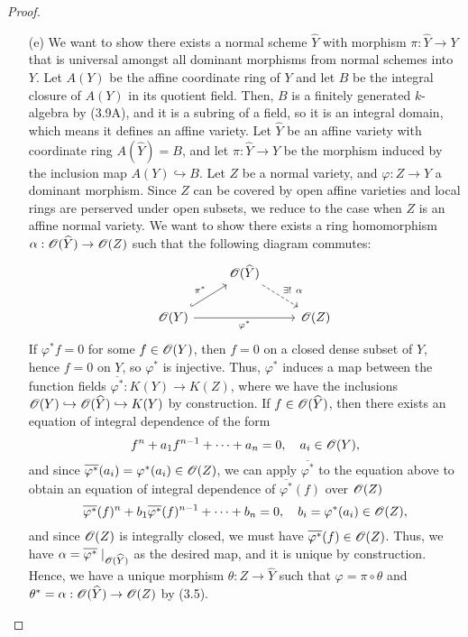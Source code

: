 \documentclass{article}
\begin{document}
\begin{enumerate} [label=\textbf{\arabic*.}, leftmargin=-0.05em]
\begin{proof}
\begin{itemize} [leftmargin=0cm]
    \item[(e)] We want to show there exists a normal scheme $\widehat{Y}$ with morphism $\pi : \widehat{Y} \to Y$ that is universal amongst all dominant morphisms from normal schemes into $Y$.
    Let $A(Y)$ be the affine coordinate ring of $Y$ and let $B$ be the integral closure of $A(Y)$ in its quotient field.
    Then, $B$ is a finitely generated $k$-algebra by (3.9A), and it is a subring of a field, so it is an integral domain, which means it defines an affine variety.
    Let $\widehat{Y}$ be an affine variety with coordinate ring $A(\widehat{Y}) = B$, and let $\pi : \widehat{Y} \to Y$ be the morphism induced by the inclusion map $A(Y) \hookrightarrow B$.
    Let $Z$ be a normal variety, and $\varphi : Z \to Y$ a dominant morphism.
    Since $Z$ can be covered by open affine varieties and local rings are perserved under open subsets, we reduce to the case when $Z$ is an affine normal variety.
    We want to show there exists a ring homomorphism $\alpha : \mathscr{O}(\widehat{Y}) \to \mathscr{O}(Z)$ such that the following diagram commutes:
    \[ \begin{tikzcd}
        & \fO(\widehat{Y}) \arrow[rd, "\exists! ~ \alpha", dashed] &        \\
        \fO(Y) \arrow[rr, "\varphi^*"'] \arrow[ru, "\pi^*", hook] &                                                      & \fO(Z)
    \end{tikzcd} \]
    If $\varphi^*f = 0$ for some $f \in \mathscr{O}(Y)$, then $f = 0$ on a closed dense subset of $Y$, hence $f = 0$ on $Y$, so $\varphi^*$ is injective.
    Thus, $\varphi^*$ induces a map between the function fields $\overline{\varphi^*} : K(Y) \to K(Z)$, where we have the inclusions $\mathscr{O}(Y) \hookrightarrow \mathscr{O}(\widehat{Y}) \hookrightarrow K(Y)$ by construction.
    If $f \in \mathscr{O}(\widehat{Y})$, then there exists an equation of integral dependence of the form
    \begin{equation*}
        f^n + a_1 f^{n - 1} + \cdots +  a_n = 0, \quad a_i \in \mathscr{O}(Y),
    \end{equation*}
    and since $\overline{\varphi^*}(a_i) = \varphi^*(a_i) \in \mathscr{O}(Z)$, we can apply $\overline{\varphi^*}$ to the equation above to obtain an equation of integral dependence of $\overline{\varphi^*}(f)$ over $\mathscr{O}(Z)$
    \begin{equation*}
        \overline{\varphi^*}(f)^n + b_1 \overline{\varphi^*}(f)^{n - 1} + \cdots + b_n = 0, \quad b_i = \varphi^*(a_i) \in \mathscr{O}(Z),
    \end{equation*}
    and since $\mathscr{O}(Z)$ is integrally closed, we must have $\overline{\varphi^*}(f) \in \mathscr{O}(Z)$. Thus, we have $\alpha = \overline{\varphi^*} \mid_{\mathscr{O}(\widehat{Y})}$ as the desired map, and it is unique by construction. Hence, we have a unique morphism $\theta : Z \to \hat{Y}$ such that $\varphi = \pi \circ \theta$ and $\theta^* = \alpha : \mathscr{O}(\widehat{Y}) \to \mathscr{O}(Z)$ by (3.5).
   \end{itemize}
\end{proof}


\end{enumerate}
\end{document}
